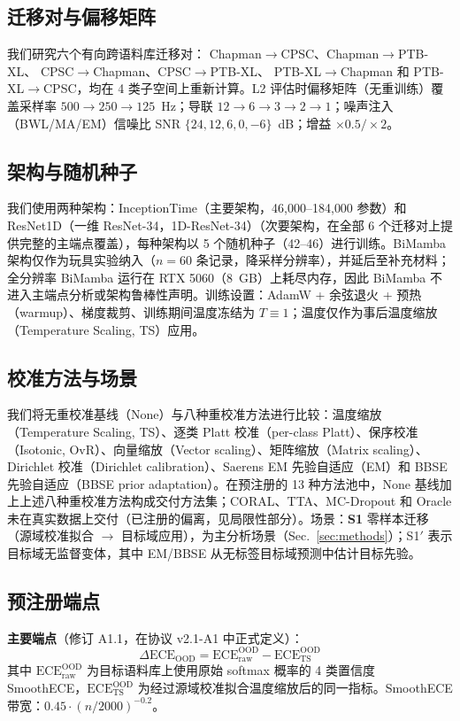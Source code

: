 \subsection{迁移对与偏移矩阵}
\label{sec:shiftmatrix}
我们研究六个有向跨语料库迁移对：
Chapman$\rightarrow$CPSC、Chapman$\rightarrow$PTB-XL、
CPSC$\rightarrow$Chapman、CPSC$\rightarrow$PTB-XL、
PTB-XL$\rightarrow$Chapman 和 PTB-XL$\rightarrow$CPSC，均在 4 类子空间上重新计算。L2 评估时偏移矩阵（无重训练）覆盖采样率 $500\rightarrow250\rightarrow125$~Hz；导联 $12\rightarrow6\rightarrow3\rightarrow2\rightarrow1$；噪声注入（BWL/MA/EM）信噪比 SNR $\{24,12,6,0,-6\}$~dB；增益 $\times0.5/\times2$。

\subsection{架构与随机种子}
我们使用两种架构：InceptionTime（主要架构，46{,}000--184{,}000 参数）和 ResNet1D（一维 ResNet-34，1D-ResNet-34）（次要架构，在全部 6 个迁移对上提供完整的主端点覆盖），每种架构以 5 个随机种子（42--46）进行训练。BiMamba 架构仅作为玩具实验纳入（$n=60$ 条记录，降采样分辨率），并延后至补充材料；全分辨率 BiMamba 运行在 RTX 5060（8~GB）上耗尽内存，因此 BiMamba 不进入主端点分析或架构鲁棒性声明。训练设置：AdamW + 余弦退火 + 预热（warmup）、梯度裁剪、训练期间温度冻结为 $T\equiv1$；温度仅作为事后温度缩放（Temperature Scaling, TS）应用。

\subsection{校准方法与场景}
我们将无重校准基线（None）与八种重校准方法进行比较：温度缩放（Temperature Scaling, TS）、逐类 Platt 校准（per-class Platt）、保序校准（Isotonic, OvR）、向量缩放（Vector scaling）、矩阵缩放（Matrix scaling）、Dirichlet 校准（Dirichlet calibration）、Saerens EM 先验自适应（EM）和 BBSE 先验自适应（BBSE prior adaptation）。在预注册的 13 种方法池中，None 基线加上上述八种重校准方法构成交付方法集；CORAL、TTA、MC-Dropout 和 Oracle 未在真实数据上交付（已注册的偏离，见局限性部分）。场景：\textbf{S1} 零样本迁移（源域校准拟合 $\rightarrow$ 目标域应用），为主分析场景（Sec.~\ref{sec:methods}）；S1$'$ 表示目标域无监督变体，其中 EM/BBSE 从无标签目标域预测中估计目标先验。

\subsection{预注册端点}
\label{sec:prereg}
\textbf{主要端点}（修订 A1.1，在协议 v2.1-A1 \cite{protocolv21a1} 中正式定义）：
\begin{equation}
    \Delta\text{ECE}_{\text{OOD}}
    = \text{ECE}_{\mathrm{raw}}^{\mathrm{OOD}} - \text{ECE}_{\mathrm{TS}}^{\mathrm{OOD}}
\end{equation}
其中 $\text{ECE}_{\mathrm{raw}}^{\mathrm{OOD}}$ 为目标语料库上使用原始 softmax 概率的 4 类置信度 SmoothECE，$\text{ECE}_{\mathrm{TS}}^{\mathrm{OOD}}$ 为经过源域校准拟合温度缩放后的同一指标。SmoothECE 带宽：$0.45\cdot(n/2000)^{-0.2}$。

